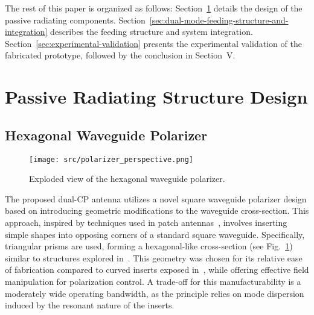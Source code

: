 \documentclass[journal]{IEEEtran}
\begin{document}
The rest of this paper is organized as follows: Section~\ref{sec:passive-radiating-structure-design} details the design of the passive radiating components. Section~\ref{sec:dual-mode-feeding-structure-and-integration} describes the feeding structure and system integration. Section~\ref{sec:experimental-validation} presents the experimental validation of the fabricated prototype, followed by the conclusion in Section~V.


\section{Passive Radiating Structure Design}
\label{sec:passive-radiating-structure-design}

\subsection{Hexagonal Waveguide Polarizer}
\label{subsec:hexagonal-waveguide-polarizer}

\begin{figure}[b]
    \centering
    \texttt{[image: src/polarizer\_perspective.png]}
    \caption{\label{fig:polarizer-perspective}Exploded view of the hexagonal waveguide polarizer.}
\end{figure}

The proposed dual-CP antenna utilizes a novel square waveguide polarizer design based on introducing geometric modifications to the waveguide cross-section. This approach, inspired by techniques used in patch antennas~\cite{armin-et-al:modification-of-a-2g2hz-sband-rectangular-patch-microstrip-antenna-using-truncated-corner-method-for-satellite-applications}, involves inserting simple shapes into opposing corners of a standard square waveguide. Specifically, triangular prisms are used, forming a hexagonal-like cross-section (see Fig.~\ref{fig:polarizer-perspective}) similar to structures explored in~\cite{bhardwaj-volakis:hexagonal-waveguides-new-class-of-waveguides-for-mmwave-circularly-polarized-horns}. This geometry was chosen for its relative ease of fabrication compared to curved inserts exposed in~\cite{garcia-marin-masa-campos:bowtie-shaped-radiating-element-for-single-and-dual-circular-polarization}, while offering effective field manipulation for polarization control. A trade-off for this manufacturability is a moderately wide operating bandwidth, as the principle relies on mode dispersion induced by the resonant nature of the inserts.
\end{document}
